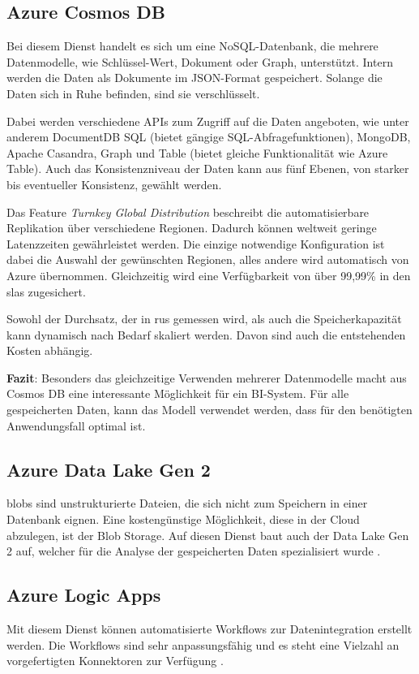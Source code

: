 \subsection{Azure Cosmos DB} \label{sec:grundlagen:azure_dienste:cosmosDB}
Bei diesem Dienst handelt es sich um eine NoSQL-Datenbank, die mehrere Datenmodelle, wie Schlüssel-Wert, Dokument oder Graph, unterstützt. Intern werden die Daten als Dokumente im JSON-Format gespeichert. Solange die Daten sich in Ruhe befinden, sind sie verschlüsselt.

Dabei werden verschiedene APIs zum Zugriff auf die Daten angeboten, wie unter anderem DocumentDB SQL (bietet gängige SQL-Abfragefunktionen), MongoDB, Apache Casandra, Graph und Table (bietet gleiche Funktionalität wie Azure Table). Auch das Konsistenzniveau der Daten kann aus fünf Ebenen, von starker bis eventueller Konsistenz, gewählt werden.

Das Feature \textit{Turnkey Global Distribution} beschreibt die automatisierbare Replikation über verschiedene Regionen. Dadurch können weltweit geringe Latenzzeiten gewährleistet werden. Die einzige notwendige Konfiguration ist dabei die Auswahl der gewünschten Regionen, alles andere wird automatisch von Azure übernommen. Gleichzeitig wird eine Verfügbarkeit von über 99,99\% in den \acp{sla} zugesichert.

Sowohl der Durchsatz, der in \acp{ru} gemessen wird, als auch die Speicherkapazität kann dynamisch nach Bedarf skaliert werden. Davon sind auch die entstehenden Kosten abhängig.
\cite{guay_paz_learning_2018}\cite{mrzyglod_hands-azure_2018}

\textbf{Fazit}: Besonders das gleichzeitige Verwenden mehrerer Datenmodelle macht aus Cosmos DB eine interessante Möglichkeit für ein BI-System. Für alle gespeicherten Daten, kann das Modell verwendet werden, dass für den benötigten Anwendungsfall optimal ist.

\subsection{Azure Data Lake Gen 2} \label{sec:grundlagen:azure_dienste:dataLake}
\acp{blob} sind unstrukturierte Dateien, die sich nicht zum Speichern in einer Datenbank eignen. Eine kostengünstige Möglichkeit, diese in der Cloud abzulegen, ist der Blob Storage. Auf diesen Dienst baut auch der Data Lake Gen 2 auf, welcher für die Analyse der gespeicherten Daten spezialisiert wurde \cite{soh_microsoft_2020}.

\subsection{Azure Logic Apps} \label{sec:grundlagen:azure_dienste:logicApps}
Mit diesem Dienst können automatisierte Workflows zur Datenintegration erstellt werden. Die Workflows sind sehr anpassungsfähig und es steht eine Vielzahl an vorgefertigten Konnektoren zur Verfügung \cite{kumar_serverless_2019}.

